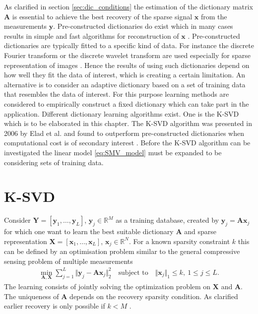 As clarified in section \ref{sec:dic_conditions} the estimation of the dictionary matrix $\mathbf{A}$ is essential to achieve the best recovery of the sparse signal $\mathbf{x}$ from the measurements $\mathbf{y}$. Pre-constructed dictionaries do exist which in many cases results in simple and fast algorithms for reconstruction of $\mathbf{x}$ \cite{Elad_book}. Pre-constructed dictionaries are typically fitted to a specific kind of data. For instance the discrete Fourier transform or the discrete wavelet transform are used especially for sparse representation of images \cite{Elad_book}. Hence the results of using such dictionaries depend on how well they fit the data of interest, which is creating a certain limitation. An alternative is to consider an adaptive dictionary based on a set of training data that resembles the data of interest. For this purpose learning methods are considered to empirically construct a fixed dictionary which can take part in the application. Different dictionary learning algorithms exist. One is the K-SVD which is to be elaborated in this chapter. The K-SVD algorithm was presented in 2006 by Elad et al. and found to outperform pre-constructed dictionaries when computational cost is of secondary interest \cite{Elad2006}. Before the K-SVD algorithm can be investigated the linear model \eqref{eq:SMV_model} must be expanded to be considering sets of training data.


\section{K-SVD}\label{sec:dictionarylearning}
Consider $\mathbf{Y} = \left[ \mathbf{y}_1, \dots, \mathbf{y}_L \right]$, $\mathbf{y}_j \in \mathbb{R}^M$ as a training database, created by $\mathbf{y}_j = \mathbf{A}\mathbf{x}_j$ for which one want to learn the best suitable dictionary $\mathbf{A}$ and sparse representation $\mathbf{X} = \left[ \mathbf{x}_1, \dots, \mathbf{x}_L  \right]$, $\mathbf{x}_j \in \mathbb{R}^N$. For a known sparsity constraint $k$ this can be defined by an optimisation problem similar to the general compressive sensing problem of multiple measurements \cite{Elad_book}
\begin{align}\label{eq:SVD1}
\min_{\mathbf{A,X}} \sum_{j=1}^{L} \Vert \mathbf{y}_j - \mathbf{Ax}_j \Vert_2^2 \quad \text{subject to} \quad \Vert \textbf{x}_j \Vert_1 \leq k, \ 1 \leq j \leq L.
\end{align}  
The learning consists of jointly solving the optimization problem on $\mathbf{X}$ and $\mathbf{A}$. The uniqueness of $\mathbf{A}$ depends on the recovery sparsity condition. As clarified earlier recovery is only possible if $k < M$ \cite{phd2015}. 

